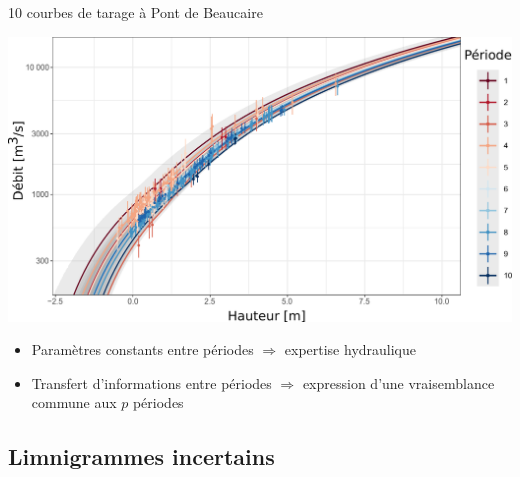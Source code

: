 \documentclass[compress,9pt]{beamer}
\begin{document}
\begin{frame}
\begin{minipage}{0.78\textwidth}
			10 courbes de tarage à Pont de Beaucaire
			\begin{center}
				\includegraphics[width = .8\textwidth]{./Figures/RClogPt.pdf}  	
			\end{center}
			\begin{itemize}
				\item<1->[$\vartriangleright$] Paramètres constants entre périodes $\Rightarrow$ expertise hydraulique
				\vfill
				\item<2->[$\vartriangleright$] Transfert d'informations entre périodes $\Rightarrow$ expression d'une vraisemblance commune aux $p$ périodes
				\vfill
			\end{itemize}
		\end{minipage}
	\end{frame}
	
	
	\subsection{Limnigrammes incertains}
	
\end{document}

